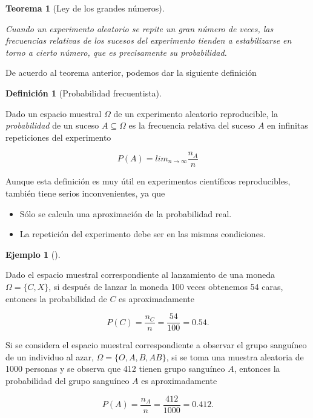 \documentclass[
  spanish,
  a4paper,
]{scrreport}
\providecommand{\tightlist}{%
  \setlength{\itemsep}{0pt}\setlength{\parskip}{0pt}}
\theoremstyle{plain}
\newtheorem{theorem}{Teorema}[chapter]
\theoremstyle{definition}
\newtheorem{example}{Ejemplo}[chapter]
\theoremstyle{definition}
\newtheorem{definition}{Definición}[chapter]
\theoremstyle{remark}
\begin{document}
\begin{theorem}[Ley de los grandes
números]\protect\hypertarget{thm-ley-grandes-numeros}{}\label{thm-ley-grandes-numeros}

Cuando un experimento aleatorio se repite un gran número de veces, las
frecuencias relativas de los sucesos del experimento tienden a
estabilizarse en torno a cierto número, que es precisamente su
probabilidad.

\end{theorem}

De acuerdo al teorema anterior, podemos dar la siguiente definición

\begin{definition}[Probabilidad
frecuentista]\protect\hypertarget{def-probabilidad-frecuentista}{}\label{def-probabilidad-frecuentista}

Dado un espacio muestral \(\Omega\) de un experimento aleatorio
reproducible, la \emph{probabilidad} de un suceso \(A\subseteq \Omega\)
es la frecuencia relativa del suceso \(A\) en infinitas repeticiones del
experimento

\[P(A) = lim_{n\rightarrow \infty}\frac{n_{A}}{n}\]

\end{definition}

Aunque esta definición es muy útil en experimentos científicos
reproducibles, también tiene serios inconvenientes, ya que

\begin{itemize}
\tightlist
\item
  Sólo se calcula una aproximación de la probabilidad real.
\item
  La repetición del experimento debe ser en las mismas condiciones.
\end{itemize}

\begin{example}[]\protect\hypertarget{exm-probabilidad-frecuentista}{}\label{exm-probabilidad-frecuentista}

Dado el espacio muestral correspondiente al lanzamiento de una moneda
\(\Omega=\{C,X\}\), si después de lanzar la moneda 100 veces obtenemos
54 caras, entonces la probabilidad de \(C\) es aproximadamente

\[P(C) = \frac{n_C}{n} = \frac{54}{100} = 0.54.\]

Si se considera el espacio muestral correspondiente a observar el grupo
sanguíneo de un individuo al azar, \(\Omega=\{O,A,B,AB\}\), si se toma
una muestra aleatoria de 1000 personas y se observa que 412 tienen grupo
sanguíneo \(A\), entonces la probabilidad del grupo sanguíneo \(A\) es
aproximadamente

\[P(A) = \frac{n_A}{n} = \frac{412}{1000} = 0.412.\]

\end{example}
\end{document}

